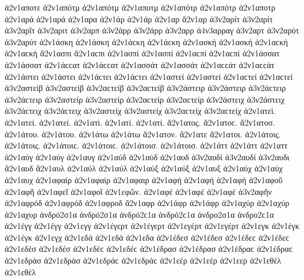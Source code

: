 {ἀ2ν1αποτε 
ἀ2ν1απότμ ἀ2ν1απότμ   %
ἀ2ν1αποτμ 
ἀ2ν1απότρ ἀ2ν1απότρ   %
ἀ2ν1αποτρ 
ἀ2ν1αρά ἀ2ν1αρά   %
ἀ2ν1αρα 
ἀ2ν1άρ ἀ2ν1άρ   %
ἀ2ν1αρ 
ἄ2ν1αρ   %
ἀ3ν2αρίτ ἀ3ν2αρίτ   %
ἀ3ν2αρῖτ   %
ἀ3ν2αριτ   %
ἀ3ν2αρπ   %
ἀ3ν2άρρ ἀ3ν2άρρ   %
ἀ3ν2αρρ 
ἀ4ν3αρραγ   %
ἀ3ν2αρτ   %
ἀ3ν2αρύτ ἀ3ν2αρύτ   %
ἀ2ν1άσκη ἀ2ν1άσκη ἀ2ν1άϲκη ἀ2ν1άϲκη   %
ἀ2ν1ασκή ἀ2ν1ασκή ἀ2ν1αϲκή ἀ2ν1αϲκή 
ἄ2ν1ασπι ἄ2ν1αϲπι   %
ἀ2ν1ασπί ἀ2ν1ασπί ἀ2ν1αϲπί ἀ2ν1αϲπί 
ἀ2ν1άσσατ ἀ2ν1άσσατ ἀ2ν1άϲϲατ ἀ2ν1άϲϲατ   %
ἀ2ν1ασσάτ ἀ2ν1ασσάτ ἀ2ν1αϲϲάτ ἀ2ν1αϲϲάτ 
ἀ2ν1άστει ἀ2ν1άστει ἀ2ν1άϲτει ἀ2ν1άϲτει   %
ἀ2ν1αστεί ἀ2ν1αστεί ἀ2ν1αϲτεί ἀ2ν1αϲτεί 
ἀ3ν2αστείβ ἀ3ν2αστείβ ἀ3ν2αϲτείβ ἀ3ν2αϲτείβ   %
ἀ3ν2άστειρ ἀ3ν2άστειρ ἀ3ν2άϲτειρ ἀ3ν2άϲτειρ   %
ἀ3ν2αστείρ ἀ3ν2αστείρ ἀ3ν2αϲτείρ ἀ3ν2αϲτείρ 
ἀ3ν2άστειχ ἀ3ν2άστειχ ἀ3ν2άϲτειχ ἀ3ν2άϲτειχ   %
ἀ3ν2αστείχ ἀ3ν2αστείχ ἀ3ν2αϲτείχ ἀ3ν2αϲτείχ 
ἀ2ν1ατεὶ.   %
ἀ2ν1ατεί. ἀ2ν1ατεί. 
ἀ2ν1ατὶ.   %
ἀ2ν1ατί. ἀ2ν1ατί. 
ἄ2ν1ατος. ἄ2ν1ατοϲ.   %
ἄ2ν1ατοσ. 
ἀ2ν1άτου. ἀ2ν1άτου. 
ἀ2ν1άτω ἀ2ν1άτω 
ἄ2ν1ατον. 
ἄ2ν1ατε 
ἄ2ν1ατοι. 
ἀ2ν1άτοις. ἀ2ν1άτοις. ἀ2ν1άτοιϲ. ἀ2ν1άτοιϲ. 
ἀ2ν1άτοισ. ἀ2ν1άτοισ. 
ἀ2ν1άττ ἀ2ν1άττ   %
ἀ2ν1αττ 
ἀ2ν1αύγ ἀ2ν1αύγ   %
ἀ2ν1αυγ 
ἀ2ν1αύδ ἀ2ν1αύδ   %
ἀ2ν1αυδ 
ἀ3ν2αυδί ἀ3ν2αυδί   %
ἀ3ν2αυδι 
ἄ2ν1αυδ   %
ἄ2ν1αυλ   %
ἀ2ν1αύλ ἀ2ν1αύλ 
ἀ2ν1αύξ ἀ2ν1αύξ   %
ἀ2ν1αυξ 
ἀ2ν1αύχ ἀ2ν1αύχ   %
ἀ2ν1αυχ 
ἀ2ν1αφαίρ ἀ2ν1αφαίρ   %
ἀ2ν1αφαιρ 
ἀ2ν1αφή ἀ2ν1αφή   %
ἀ2ν1αφὴ 
ἀ2ν1αφοῦ 
ἀ2ν1αφῆ 
ἀ2ν1αφεῖ 
ἀ2ν1αφοῖ 
ἀ2ν1εφῶν. 
ἀ2ν1αφέ ἀ2ν1αφέ 
ἀ2ν1αφὲ 
ἀ3ν2αφῆν   %
ἀ2ν1αφρόδ ἀ2ν1αφρόδ   %
ἀ2ν1αφροδ 
ἄ2ν1αφρ   %
ἀ2ν1άφρ ἀ2ν1άφρ 
ἀ2ν1αχύρ ἀ2ν1αχύρ   %
ἀ2ν1αχυρ 
ἀνδρό2σ1α ἀνδρό2σ1α ἀνδρό2ϲ1α ἀνδρό2ϲ1α   %
ἀνδρο2σ1α ἀνδρο2ϲ1α 
ἀ2ν1έγγ ἀ2ν1έγγ   %
ἀ2ν1εγγ 
ἀ2ν1έγερτ ἀ2ν1έγερτ   %
ἀ2ν1εγέρτ ἀ2ν1εγέρτ 
ἀ2ν1εγκ   %
ἀ2ν1έγκ ἀ2ν1έγκ   %
ἀ2ν1εγχ   %
ἀ2ν1εδά ἀ2ν1εδά   %
ἀ2ν1εδα 
ἀ2ν1έδεσ ἀ2ν1έδεσ ἀ2ν1έδεϲ ἀ2ν1έδεϲ   %
ἀ2ν1εδέσ ἀ2ν1εδέσ ἀ2ν1εδέϲ ἀ2ν1εδέϲ 
ἀ2ν1έδρασ ἀ2ν1έδρασ ἀ2ν1έδραϲ ἀ2ν1έδραϲ   %
ἀ2ν1εδράσ ἀ2ν1εδράσ ἀ2ν1εδράϲ ἀ2ν1εδράϲ 
ἀ2ν1εέρ ἀ2ν1εέρ   %
ἀ2ν1εερ 
ἀ2ν1εθέλ ἀ2ν1εθέλ   %
}
